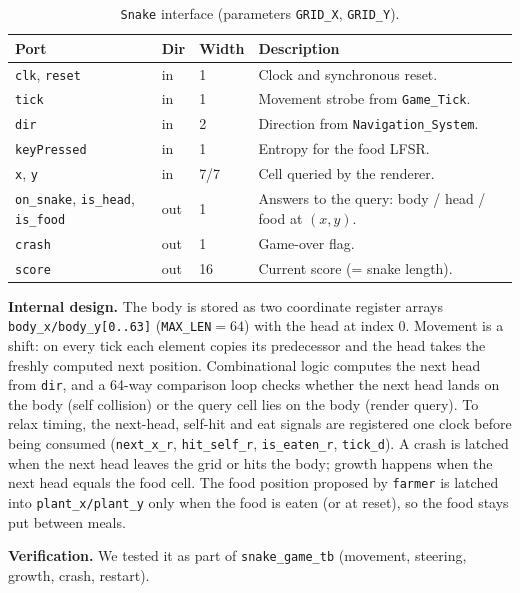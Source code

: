 \documentclass[11pt,a4paper]{article}
\begin{document}
\begin{table}[H]
  \centering\small
  \caption{\texttt{Snake} interface (parameters \texttt{GRID\_X}, \texttt{GRID\_Y}).}
  \begin{tabular}{lllp{}}
    \toprule
    \textbf{Port} & \textbf{Dir} & \textbf{Width} & \textbf{Description} \\
    \midrule
    \texttt{clk}, \texttt{reset} & in & 1 & Clock and synchronous reset. \\
    \texttt{tick} & in & 1 & Movement strobe from \texttt{Game\_Tick}. \\
    \texttt{dir}  & in & 2 & Direction from \texttt{Navigation\_System}. \\
    \texttt{keyPressed} & in & 1 & Entropy for the food LFSR. \\
    \texttt{x}, \texttt{y} & in & 7/7 & Cell queried by the renderer. \\
    \texttt{on\_snake}, \texttt{is\_head}, \texttt{is\_food} & out & 1 &
      Answers to the query: body / head / food at $(x,y)$. \\
    \texttt{crash} & out & 1 & Game-over flag. \\
    \texttt{score} & out & 16 & Current score (= snake length). \\
    \bottomrule
  \end{tabular}
\end{table}

\textbf{Internal design.} The body is stored as two coordinate register
arrays \texttt{body\_x/body\_y[0..63]} (\texttt{MAX\_LEN}$=64$) with the
head at index 0. Movement is a shift: on every tick each element copies
its predecessor and the head takes the freshly computed next position.
Combinational logic computes the next head from \texttt{dir}, and a
64-way comparison loop checks whether the next head lands on the body
(self collision) or the query cell lies on the body (render query). To
relax timing, the next-head, self-hit and eat signals are registered one
clock before being consumed (\texttt{next\_x\_r}, \texttt{hit\_self\_r},
\texttt{is\_eaten\_r}, \texttt{tick\_d}). A crash is latched when the
next head leaves the grid or hits the body; growth happens when the next
head equals the food cell. The food position proposed by \texttt{farmer}
is latched into \texttt{plant\_x/plant\_y} only when the food is eaten
(or at reset), so the food stays put between meals.

\textbf{Verification.} We tested it as part of \texttt{snake\_game\_tb}
(movement, steering, growth, crash, restart).
\end{document}
